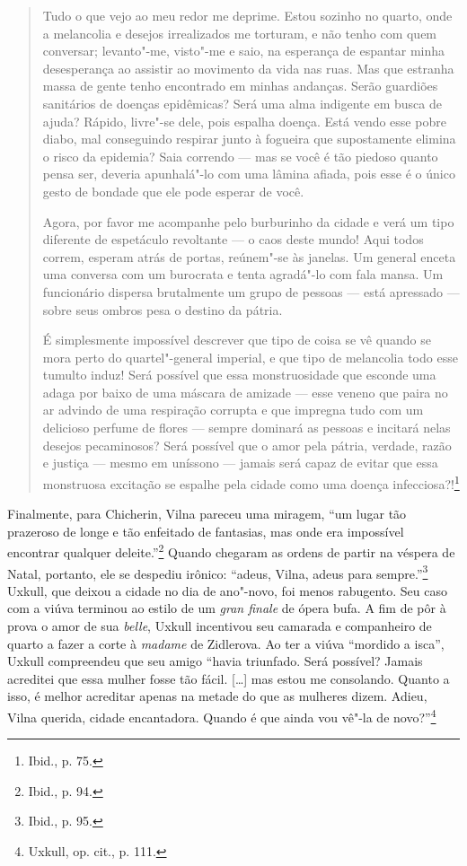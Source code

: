 \begin{quote}
Tudo o que vejo ao meu redor me deprime. Estou sozinho no quarto, onde a
melancolia e desejos irrealizados me torturam, e não tenho com quem
conversar; levanto"-me, visto"-me e saio, na esperança de espantar minha
desesperança ao assistir ao movimento da vida nas ruas. Mas que estranha
massa de gente tenho encontrado em minhas andanças. Serão guardiões
sanitários de doenças epidêmicas? Será uma alma indigente em busca de
ajuda? Rápido, livre"-se dele, pois espalha doença. Está vendo esse pobre
diabo, mal conseguindo respirar junto à fogueira que supostamente
elimina o risco da epidemia? Saia correndo --- mas se você é tão piedoso
quanto pensa ser, deveria apunhalá"-lo com uma lâmina afiada, pois esse é
o único gesto de bondade que ele pode esperar de você.

Agora, por favor me acompanhe pelo burburinho da cidade e verá um tipo
diferente de espetáculo revoltante --- o caos deste mundo! Aqui todos
correm, esperam atrás de portas, reúnem"-se às janelas. Um general enceta
uma conversa com um burocrata e tenta agradá"-lo com fala mansa. Um
funcionário dispersa brutalmente um grupo de pessoas --- está apressado ---
sobre seus ombros pesa o destino da pátria.

É simplesmente impossível descrever que tipo de coisa se vê quando se
mora perto do quartel"-general imperial, e que tipo de melancolia todo
esse tumulto induz! Será possível que essa monstruosidade que esconde
uma adaga por baixo de uma máscara de amizade --- esse veneno que paira no
ar advindo de uma respiração corrupta e que impregna tudo com um
delicioso perfume de flores --- sempre dominará as pessoas e incitará
nelas desejos pecaminosos? Será possível que o amor pela pátria,
verdade, razão e justiça --- mesmo em uníssono --- jamais será capaz de
evitar que essa monstruosa excitação se espalhe pela cidade como uma
doença infecciosa?!\footnote{Ibid., p. 75.}
\end{quote}

Finalmente, para Chicherin, Vilna pareceu uma miragem, ``um lugar tão
prazeroso de longe e tão enfeitado de fantasias, mas onde era impossível
encontrar qualquer deleite.''\footnote{Ibid., p. 94.} Quando chegaram as
ordens de partir na véspera de Natal, portanto, ele se despediu irônico:
``adeus, Vilna, adeus para sempre.''\footnote{Ibid., p. 95.} Uxkull, que
deixou a cidade no dia de ano"-novo, foi menos rabugento. Seu caso com a
viúva terminou ao estilo de um \textit{gran finale} de ópera bufa. A fim
de pôr à prova o amor de sua \textit{belle}, Uxkull incentivou seu camarada e
companheiro de quarto a fazer a corte à \textit{madame} de Zidlerova. Ao ter a
viúva ``mordido a isca'', Uxkull compreendeu que seu amigo ``havia
triunfado. Será possível? Jamais acreditei que essa mulher fosse tão
fácil. [\ldots{}] mas estou me consolando. Quanto a isso, é melhor
acreditar apenas na metade do que as mulheres dizem. Adieu, Vilna
querida, cidade encantadora. Quando é que ainda vou vê"-la de
novo?''\footnote{Uxkull, op. cit., p. 111.}

